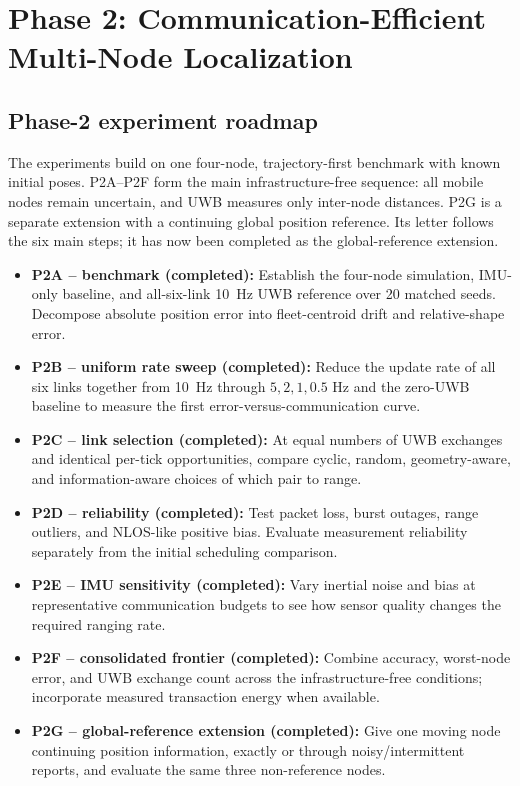 \chapter{Phase 2: Communication-Efficient Multi-Node Localization}

\section{Phase-2 experiment roadmap}\label{sec:phase2_plan}
The experiments build on one four-node, trajectory-first benchmark with known initial poses. P2A--P2F form the main infrastructure-free sequence: all mobile nodes remain uncertain, and UWB measures only inter-node distances. P2G is a separate extension with a continuing global position reference. Its letter follows the six main steps; it has now been completed as the global-reference extension.

\begin{itemize}
    \item \textbf{P2A -- benchmark (completed):} Establish the four-node simulation, IMU-only baseline, and all-six-link \SI{10}{Hz} UWB reference over 20 matched seeds. Decompose absolute position error into fleet-centroid drift and relative-shape error.
    \item \textbf{P2B -- uniform rate sweep (completed):} Reduce the update rate of all six links together from \SI{10}{Hz} through \(5,2,1,0.5\) Hz and the zero-UWB baseline to measure the first error-versus-communication curve.
    \item \textbf{P2C -- link selection (completed):} At equal numbers of UWB exchanges and identical per-tick opportunities, compare cyclic, random, geometry-aware, and information-aware choices of which pair to range.
    \item \textbf{P2D -- reliability (completed):} Test packet loss, burst outages, range outliers, and NLOS-like positive bias. Evaluate measurement reliability separately from the initial scheduling comparison.
    \item \textbf{P2E -- IMU sensitivity (completed):} Vary inertial noise and bias at representative communication budgets to see how sensor quality changes the required ranging rate.
    \item \textbf{P2F -- consolidated frontier (completed):} Combine accuracy, worst-node error, and UWB exchange count across the infrastructure-free conditions; incorporate measured transaction energy when available.
    \item \textbf{P2G -- global-reference extension (completed):} Give one moving node continuing position information, exactly or through noisy/intermittent reports, and evaluate the same three non-reference nodes.
\end{itemize}

